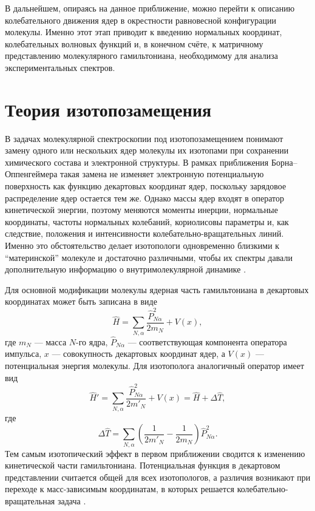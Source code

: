 В дальнейшем, опираясь на данное приближение, можно перейти
к описанию колебательного движения ядер в окрестности равновесной
конфигурации молекулы. Именно этот этап приводит к введению
нормальных координат, колебательных волновых функций и,
в конечном счёте, к матричному представлению молекулярного
гамильтониана, необходимому для анализа экспериментальных спектров.

\section{Теория изотопозамещения}

В задачах молекулярной спектроскопии под изотопозамещением понимают замену одного
или нескольких ядер молекулы их изотопами при сохранении химического состава и
электронной структуры. В рамках приближения Борна--Оппенгеймера такая замена
не изменяет электронную потенциальную поверхность как функцию декартовых
координат ядер, поскольку зарядовое распределение ядер остается тем же. Однако
массы ядер входят в оператор кинетической энергии, поэтому меняются моменты
инерции, нормальные координаты, частоты нормальных колебаний, кориолисовы
параметры и, как следствие, положения и интенсивности колебательно-вращательных
линий. Именно это обстоятельство делает изотопологи одновременно близкими к
``материнской'' молекуле и достаточно различными, чтобы их спектры давали
дополнительную информацию о внутримолекулярной динамике
\cite{Wilson1936,WilsonDeciusCross1955,Papousek1982,BunkerJensen1998}.

Для основной модификации молекулы ядерная часть гамильтониана в декартовых
координатах может быть записана в виде
\begin{equation}
\hat{H}=\sum_{N,\alpha}\frac{\hat{P}_{N\alpha}^{2}}{2m_N}+V(x),
\end{equation}
где $m_N$ --- масса $N$-го ядра, $\hat{P}_{N\alpha}$ --- соответствующая компонента
оператора импульса, $x$ --- совокупность декартовых координат ядер, а $V(x)$ ---
потенциальная энергия молекулы. Для изотополога аналогичный оператор имеет вид
\begin{equation}
\hat{H}'=\sum_{N,\alpha}\frac{\hat{P}_{N\alpha}^{2}}{2m'_N}+V(x)
       =\hat{H}+\Delta \hat{T},
\end{equation}
где
\begin{equation}
\Delta \hat{T}=\sum_{N,\alpha}
\left(\frac{1}{2m'_N}-\frac{1}{2m_N}\right)\hat{P}_{N\alpha}^{2} .
\end{equation}
Тем самым изотопический эффект в первом приближении сводится к изменению
кинетической части гамильтониана. Потенциальная функция в декартовом
представлении считается общей для всех изотопологов, а различия возникают при
переходе к масс-зависимым координатам, в которых решается колебательно-вращательная задача \cite{byk}.

